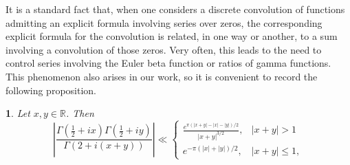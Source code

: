 \documentclass[10pt,a4paper]{amsart}
\numberwithin{equation}{section}
\numberwithin{figure}{section}
\newtheorem{prop}[thm]{\protect\propositionname}
\providecommand{\propositionname}{Proposition}
\begin{document}
It is a standard fact that, when one considers a discrete convolution
of functions admitting an explicit formula involving series over zeros,
the corresponding explicit formula for the convolution is related,
in one way or another, to a sum involving a convolution of those zeros.
Very often, this leads to the need to control series involving the
Euler beta function or ratios of gamma functions. This phenomenon
also arises in our work, so it is convenient to record the following
proposition.
\begin{prop}
\label{prop:gamma est}Let $x,y\in\mathbb{R}$. Then
\[
\left|\frac{\Gamma\left(\frac{1}{2}+ix\right)\Gamma\left(\frac{1}{2}+iy\right)}{\Gamma\left(2+i(x+y)\right)}\right|\ll\begin{cases}
\frac{e^{\pi\left(\left|x+y\right|-\left|x\right|-\left|y\right|\right)/2}}{\left|x+y\right|^{3/2}}, & \left|x+y\right|>1\\
e^{-\pi\left(\left|x\right|+\left|y\right|\right)/2}, & \left|x+y\right|\leq1,
\end{cases}
\]
\end{prop}
\end{document}
